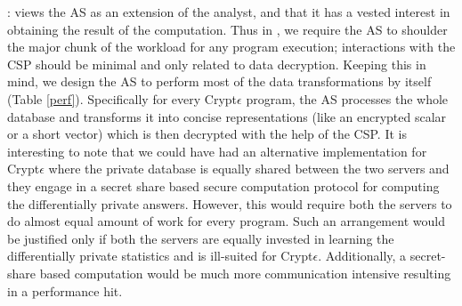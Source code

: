 : \system views the \textsf{AS} as an extension of the analyst, and that it has a vested interest in obtaining the result of the computation.   Thus in \system, we require the \textsf{AS} to  shoulder the major chunk of the workload for any \system program execution; interactions with the \textsf{CSP} should be minimal and only related to data decryption.
Keeping this in  mind, we design the \textsf{AS} to perform most of the data transformations by itself (Table \ref{perf}). Specifically for every Crypt$\epsilon$ program, the \textsf{AS} processes the whole database and transforms it into concise representations (like an encrypted scalar or a short vector) which is then decrypted with the help of the \textsf{CSP}. It is interesting to note that we could have had an alternative implementation for Crypt$\epsilon$ where the private database is equally shared between the two servers and they engage in a secret share based secure computation protocol for computing the differentially private answers. However, this would require both the servers to do almost equal amount of work for every program. Such an arrangement would be justified only if both the servers are equally invested in learning the differentially private statistics and is ill-suited for Crypt$\epsilon$. Additionally, a secret-share based computation would be much more communication intensive resulting in a performance hit. 


